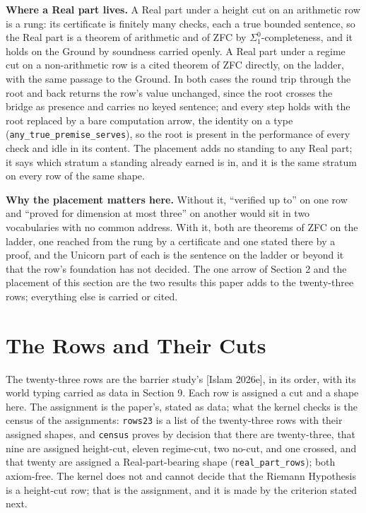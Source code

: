 \documentclass[10pt,twocolumn]{article}
\begin{document}
\textbf{Where a Real part lives.} A Real part under a height cut on an
arithmetic row is a rung: its certificate is finitely many checks, each
a true bounded sentence, so the Real part is a theorem of arithmetic and
of ZFC by \(\Sigma^0_1\)-completeness, and it holds on the Ground by
soundness carried openly. A Real part under a regime cut on a
non-arithmetic row is a cited theorem of ZFC directly, on the ladder,
with the same passage to the Ground. In both cases the round trip
through the root and back returns the row's value unchanged, since the
root crosses the bridge as presence and carries no keyed sentence; and
every step holds with the root replaced by a bare computation arrow, the
identity on a type (\texttt{any\_true\_premise\_serves}), so the root is
present in the performance of every check and idle in its content. The
placement adds no standing to any Real part; it says which stratum a
standing already earned is in, and it is the same stratum on every row
of the same shape.

\textbf{Why the placement matters here.} Without it, ``verified up to''
on one row and ``proved for dimension at most three'' on another would
sit in two vocabularies with no common address. With it, both are
theorems of ZFC on the ladder, one reached from the rung by a
certificate and one stated there by a proof, and the Unicorn part of
each is the sentence on the ladder or beyond it that the row's
foundation has not decided. The one arrow of Section 2 and the placement
of this section are the two results this paper adds to the twenty-three
rows; everything else is carried or cited.

\hypertarget{the-rows-and-their-cuts}{%
\section{The Rows and Their Cuts}\label{the-rows-and-their-cuts}}

The twenty-three rows are the barrier study's {[}Islam 2026e{]}, in its
order, with its world typing carried as data in Section 9. Each row is
assigned a cut and a shape here. The assignment is the paper's, stated
as data; what the kernel checks is the census of the assignments:
\texttt{rows23} is a list of the twenty-three rows with their assigned
shapes, and \texttt{census} proves by decision that there are
twenty-three, that nine are assigned height-cut, eleven regime-cut, two
no-cut, and one crossed, and that twenty are assigned a
Real-part-bearing shape (\texttt{real\_part\_rows}); both axiom-free.
The kernel does not and cannot decide that the Riemann Hypothesis is a
height-cut row; that is the assignment, and it is made by the criterion
stated next.
\end{document}

